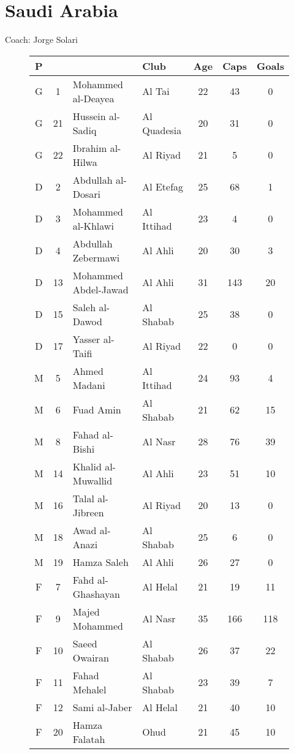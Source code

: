 \chapter{Saudi Arabia}
\newline
\newline
Coach: Jorge Solari
\begin{figure}[H]
\begin{tabular}{c c l l c c c}
P & & & Club & Age & Caps & Goals \\ \hline
G & 1 & Mohammed al-Deayea & Al Tai & 22 & 43 & 0 \\
G & 21 & Hussein al-Sadiq & Al Quadesia & 20 & 31 & 0 \\
G & 22 & Ibrahim al-Hilwa & Al Riyad & 21 & 5 & 0 \\ \hline
D & 2 & Abdullah al-Dosari & Al Etefag & 25 & 68 & 1 \\
D &  3 & Mohammed al-Khlawi & Al Ittihad & 23 & 4 & 0 \\
D &  4 & Abdullah Zebermawi & Al Ahli & 20 & 30 & 3 \\
D & 13 & Mohammed Abdel-Jawad & Al Ahli & 31 & 143 & 20 \\
D & 15 & Saleh al-Dawod & Al Shabab & 25 & 38 & 0 \\
D & 17 & Yasser al-Taifi &  Al Riyad & 22 & 0 & 0 \\ \hline
M & 5 & Ahmed Madani & Al Ittihad & 24 & 93 & 4 \\
M & 6 & Fuad Amin & Al Shabab & 21 & 62 & 15 \\
M & 8 & Fahad al-Bishi & Al Nasr & 28 & 76 & 39 \\
M & 14 & Khalid al-Muwallid & Al Ahli & 23 & 51 & 10 \\
M & 16 & Talal al-Jibreen & Al Riyad & 20 & 13 & 0 \\
M & 18 & Awad al-Anazi & Al Shabab & 25 & 6 & 0 \\
M & 19 & Hamza Saleh & Al Ahli & 26 & 27 & 0 \\ \hline
F & 7 & Fahd al-Ghashayan & Al Helal & 21 & 19 & 11 \\
F & 9 & Majed Mohammed & Al Nasr & 35 & 166 & 118 \\
F & 10 & Saeed Owairan & Al Shabab & 26 & 37 & 22 \\
F & 11 & Fahad Mehalel & Al Shabab & 23 & 39 & 7 \\
F & 12 & Sami al-Jaber & Al Helal & 21 & 40 & 10 \\
F & 20 & Hamza Falatah & Ohud & 21 & 45 & 10 \\ \hline
\end{tabular}
\end{figure}
